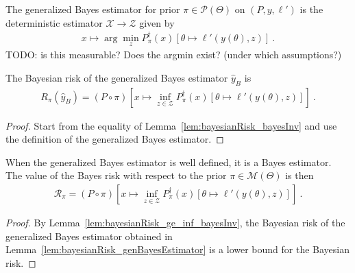 \begin{definition}
  \label{def:genBayesEstimator}
  The generalized Bayes estimator for prior $\pi \in \mathcal P(\Theta)$ on $(P, y, \ell')$ is the deterministic estimator $\mathcal X \to \mathcal Z$ given by
  \begin{align*}
  x \mapsto \arg\min_z P_\pi^\dagger(x)\left[\theta \mapsto \ell'(y(\theta), z)\right] \: .
  \end{align*}
  TODO: is this measurable? Does the argmin exist? (under which assumptions?)
\end{definition}

\begin{lemma}
  \label{lem:bayesianRisk_genBayesEstimator}
  The Bayesian risk of the generalized Bayes estimator $\hat{y}_B$ is
  \begin{align*}
  R_\pi(\hat{y}_B) = (P \circ \pi)\left[x \mapsto \inf_{z \in \mathcal Z} P_\pi^\dagger(x) \left[\theta \mapsto \ell'(y(\theta), z)\right]\right]
  \: .
  \end{align*}
\end{lemma}

\begin{proof}%
{}
Start from the equality of Lemma~\ref{lem:bayesianRisk_bayesInv} and use the definition of the generalized Bayes estimator.
\end{proof}

\begin{theorem}
  \label{thm:isBayesEstimator_genBayesEstimator}
  When the generalized Bayes estimator is well defined, it is a Bayes estimator. The value of the Bayes risk with respect to the prior $\pi \in \mathcal M(\Theta)$ is then
  \begin{align*}
  \mathcal R_\pi = (P \circ \pi)\left[x \mapsto \inf_{z \in \mathcal Z} P_\pi^\dagger(x) \left[\theta \mapsto \ell'(y(\theta), z)\right]\right]
  \: .
  \end{align*}
\end{theorem}

\begin{proof}%
{}
By Lemma~\ref{lem:bayesianRisk_ge_inf_bayesInv}, the Bayesian risk of the generalized Bayes estimator obtained in Lemma~\ref{lem:bayesianRisk_genBayesEstimator} is a lower bound for the Bayesian risk.
\end{proof}

